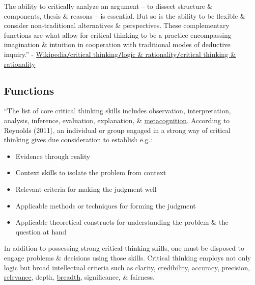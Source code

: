 \documentclass[oneside]{book}
\numberwithin{equation}{section}
\begin{document}
The ability to critically analyze an argument -- to dissect structure \& components, thesis \& reasons -- is essential. But so is the ability to be flexible \& consider non-traditional alternatives \& perspectives. These complementary functions are what allow for critical thinking to be a practice encompassing imagination \& intuition in cooperation with traditional modes of deductive inquiry.'' - \href{https://en.wikipedia.org/wiki/Critical_thinking#Critical_thinking_and_rationality}{Wikipedia\texttt{/}critical thinking\texttt{/}logic \& rationality\texttt{/}critical thinking \& rationality}

\subsection{Functions}
``The list of core critical thinking skills includes observation, interpretation, analysis, inference, evaluation, explanation, \& \href{https://en.wikipedia.org/wiki/Metacognition}{metacognition}. According to Reynolds (2011), an individual or group engaged in a strong way of critical thinking gives due consideration to establish e.g.:
\begin{itemize}
	\item Evidence through reality
	\item Context skills to isolate the problem from context
	\item Relevant criteria for making the judgment well
	\item Applicable methods or techniques for forming the judgment
	\item Applicable theoretical constructs for understanding the problem \& the question at hand
\end{itemize}
In addition to possessing strong critical-thinking skills, one must be disposed to engage problems \& decisions using those skills. Critical thinking employs not only \href{https://en.wikipedia.org/wiki/Logic}{logic} but broad \href{https://en.wikipedia.org/wiki/Intellect}{intellectual} criteria such as clarity, \href{https://en.wikipedia.org/wiki/Credibility}{credibility}, \href{https://en.wikipedia.org/wiki/Accuracy}{accuracy}, precision, \href{https://en.wikipedia.org/wiki/Relevance}{relevance}, depth, \href{https://en.wikipedia.org/wiki/Breadth}{breadth}, significance, \& fairness.
\end{document}

